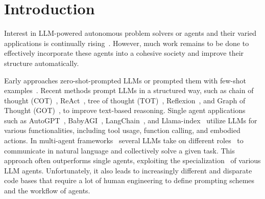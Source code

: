 \documentclass{article}
\theoremstyle{plain}
\theoremstyle{definition}
\theoremstyle{remark}
\begin{document}
\printAffiliationsAndNotice{\icmlEqualContribution}

\begin{abstract}

Various human-designed prompt engineering techniques have been proposed to improve problem solvers based on Large Language Models (LLMs), yielding many disparate code bases.
We unify these approaches by describing LLM-based agents as computational graphs.
The nodes implement functions to process multimodal data or query LLMs, and the edges describe the information flow between operations. 
Graphs can be recursively combined into larger composite graphs representing hierarchies of inter-agent collaboration
(where edges connect operations of different agents).
Our novel automatic graph optimizers (1) refine node-level LLM prompts (node optimization) and (2) improve agent orchestration by changing graph connectivity (edge optimization).
Experiments demonstrate that our framework can be used to efficiently develop, integrate, and automatically improve various LLM agents.
The code can be found \href{https://github.com/metauto-ai/gptswarm}{here}.
\end{abstract}

\section{Introduction}

Interest in LLM-powered autonomous problem solvers or agents and their varied applications is continually rising~\citep{wang2023survey,xi2023rise}.
However, much work remains to be done to effectively incorporate these agents into a cohesive society and improve their structure automatically.

Early approaches zero-shot-prompted LLMs or prompted them with few-shot examples~\citep{kojima2022large,brown2020language}. 
Recent methods prompt LLMs in a structured way, such as chain of thought (COT)~\citep{wei2022chain}, ReAct~\citep{yao2022react}, tree of thought (TOT)~\citep{yao2023tree}, Reflexion~\citep{shinn2023reflexion}, and Graph of Thought (GOT)~\citep{besta2023graph}, to improve text-based reasoning.
Single agent applications such as AutoGPT~\citep{autogpt_github}, BabyAGI~\citep{nakajima2023babyagi}, LangChain~\citep{Chase_LangChain_2022}, and Llama-index~\citep{Liu_LlamaIndex_2022} utilize LLMs for various functionalities, including tool usage, function calling, and embodied actions.
In multi-agent frameworks~\citep{zeng2022socratic,zhuge2023mindstorms} several LLMs take on different roles~\citep{li2023camel,park2023generative,qian2023communicative,wu2023autogen} 
to communicate in natural language and collectively solve a given task.
This approach often outperforms single agents, exploiting the specialization~\citep{hong2023metagpt} of various LLM agents. 
Unfortunately, it also leads to increasingly different and disparate code bases that require a lot of human engineering to define prompting schemes and the workflow of agents.
\end{document}

